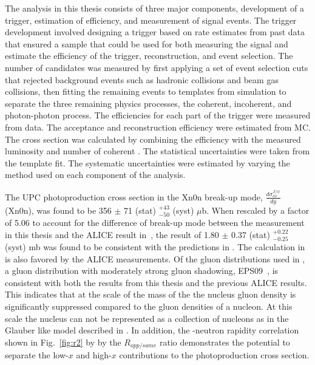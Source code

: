     The analysis in this thesis consists of three major components, development
      of a trigger, estimation of efficiency, and measurement of signal events.
    The trigger development involved designing a trigger based on rate estimates
      from past data that ensured a sample that could be used for both measuring
      the signal and estimate the efficiency of the trigger, reconstruction, and
      event selection.
    The number of \JPsi{} candidates was measured by first applying a set 
      of event selection cuts that rejected background events such as hadronic
      collisions and beam gas collisions, then fitting the remaining events to
      templates from simulation to separate the three remaining physics processes,
      the coherent, incoherent, and photon-photon process.
    The efficiencies for each part of the trigger were measured from data. 
    The acceptance and reconstruction efficiency were estimated from MC.
    The cross section was calculated by combining the efficiency with the 
      measured luminosity and number of coherent \JPsi{}.
    The statistical uncertainties were taken from the template fit.
    The systematic uncertainties were estimated by varying the method used on 
      each component of the analysis. 
  
    The UPC \JPsi{} photoproduction cross section in the Xn0n break-up mode, $\frac{d\sigma^{J/\psi}_{co}}{dy}$ (Xn0n),
      was found to be 356 $\pm$ 71 (stat) $^{+43}_{-50}$ (syst) $\mu$b. 
    When rescaled by a factor of 5.06 to account for the difference of break-up mode between 
      the measurement in this thesis and the ALICE result in~\cite{Abelev:2012ba,Abbas:2013oua}, the 
      result of 1.80 $\pm$ 0.37 (stat) $^{+0.22}_{-0.25}$ (syst) mb was found to be consistent with the 
      predictions in \cite{pQCD2013.02}.  
    The calculation in \cite{pQCD2013.02} is also favored by the ALICE measurements. 
    Of the gluon distributions used in \cite{pQCD2013.02}, a gluon distribution with 
      moderately strong gluon shadowing, EPS09~\cite{Eskola:2009uj}, is consistent with both the results from this
      thesis and the previous ALICE results. 
    This indicates that at the scale of the mass of the \JPsi{} the nucleus gluon density is 
      significantly suppressed compared to the gluon densities of a nucleon.
    At this scale the nucleus can not be represented as a collection of nucleons as in the 
      Glauber like model described in \cite{vmd1999}.
    In addition, the \JPsi{}-neutron rapidity correlation shown in Fig.~\ref{fig:r2} by 
      by the $R_{opp/same}$ ratio demonstrates the potential to separate the low-$x$ 
      and high-$x$ contributions to the photoproduction cross section.
  
